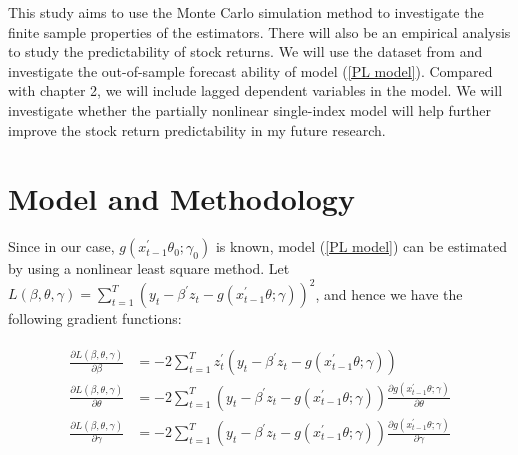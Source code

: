 \documentclass[a4paper,12pt,times,numbered,print,index]{report}
\numberwithin{equation}{section}
\begin{document}
This study aims to use the Monte Carlo simulation method to investigate the finite sample properties of the estimators. There will also be an empirical analysis to study the predictability of stock returns. We will use the dataset from \cite{welch2008comprehensive} and investigate the out-of-sample forecast ability of model (\ref{PL model}). Compared with chapter 2, we will include lagged dependent variables in the model. We will investigate whether the partially nonlinear single-index model will help further improve the stock return predictability in my future research.  



%
\section{Model and Methodology}

Since in our case, $g\left( x_{t-1}^{\prime }\theta_0; \gamma_0\right)$ is known, model (\ref{PL model}) can be estimated by using a nonlinear least square method. Let $L(\beta, \theta, \gamma) = \sum_{t=1}^{T} \left( y_t - \beta^{\prime} z_t - g\left( x_{t-1}^{\prime }\theta; \gamma\right)\right) ^2$, and hence we have the following gradient functions:


\begin{align}
	\begin{split}
	\frac{\partial L(\beta, \theta, \gamma)}{\partial \beta} &= -2\sum_{t=1}^{T} z_t^{\prime} \left( y_t - \beta^{\prime} z_t - g\left( x_{t-1}^{\prime }\theta; \gamma\right)\right) \\
	\frac{\partial L(\beta, \theta, \gamma)}{\partial \theta} &= -2\sum_{t=1}^{T} \left( y_t - \beta^{\prime} z_t - g\left( x_{t-1}^{\prime }\theta; \gamma\right)\right)\frac{\partial g(x_{t-1}^{\prime }\theta; \gamma)}{\partial \theta} \\
	\frac{\partial L(\beta, \theta, \gamma)}{\partial \gamma} &= -2\sum_{t=1}^{T} \left( y_t - \beta^{\prime} z_t - g\left( x_{t-1}^{\prime }\theta; \gamma\right)\right) \frac{\partial g(x_{t-1}^{\prime }\theta; \gamma)}{\partial \gamma}
	\end{split}
	\label{gradient}
\end{align}
\end{document}

